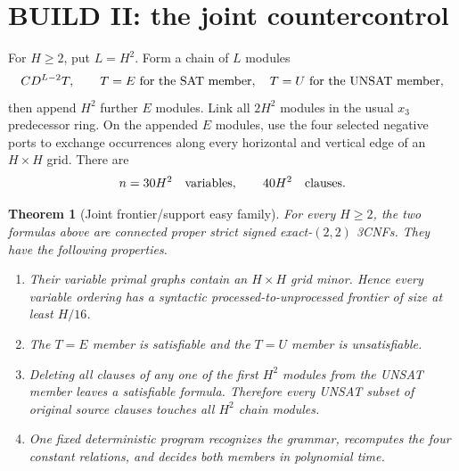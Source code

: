\documentclass[11pt]{article}
\newtheorem{theorem}{Theorem}
\begin{document}
\section{BUILD II: the joint countercontrol}
For $H\ge2$, put $L=H^2$.  Form a chain of $L$ modules
\[
 C D^{L-2}T,
 \qquad T=E\ \hbox{for the SAT member},\quad T=U\ \hbox{for the UNSAT member},
\]
then append $H^2$ further $E$ modules.  Link all $2H^2$ modules in the usual
$x_3$ predecessor ring.  On the appended $E$ modules, use the four selected
negative ports to exchange occurrences along every horizontal and vertical
edge of an $H\times H$ grid.  There are
\[
 n=30H^2\quad\hbox{variables},\qquad 40H^2\quad\hbox{clauses}.
\]

\begin{theorem}[Joint frontier/support easy family]
For every $H\ge2$, the two formulas above are connected proper strict signed
exact-$(2,2)$ 3CNFs.  They have the following properties.
\begin{enumerate}
\item Their variable primal graphs contain an $H\times H$ grid minor.  Hence every
variable ordering has a syntactic processed-to-unprocessed frontier of size
at least $H/16$.
\item The $T=E$ member is satisfiable and the $T=U$ member is unsatisfiable.
\item Deleting all clauses of any one of the first $H^2$ modules from the
UNSAT member leaves a satisfiable formula.  Therefore every UNSAT subset of
original source clauses touches all $H^2$ chain modules.
\item One fixed deterministic program recognizes the grammar, recomputes the
four constant relations, and decides both members in polynomial time.
\end{enumerate}
\end{theorem}
\end{document}

